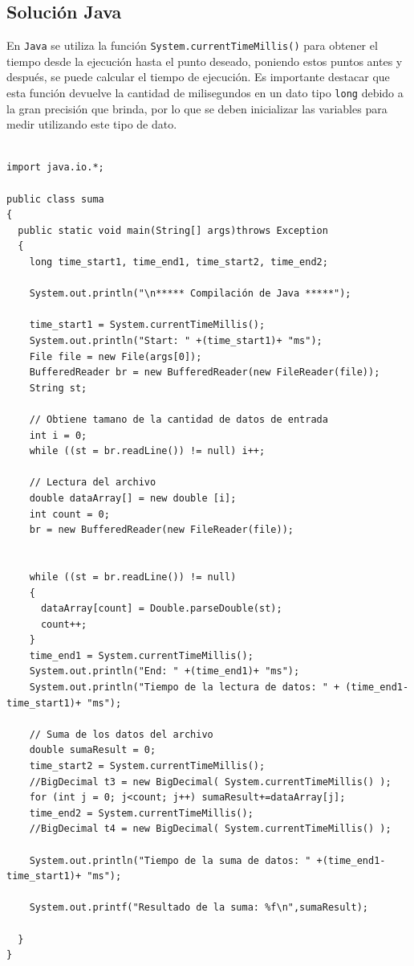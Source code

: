 \subsection{Solución Java}

En \texttt{Java} se utiliza la función \texttt{System.currentTimeMillis()} para obtener el tiempo desde la ejecución hasta el punto deseado, poniendo estos puntos antes y después, se puede calcular el tiempo de ejecución. Es importante destacar que esta función devuelve la cantidad de milisegundos en un dato tipo \texttt{long} debido a la gran precisión que brinda, por lo que se deben inicializar las variables para medir utilizando este tipo de dato.

\begin{verbatim}

import java.io.*;

public class suma
{
  public static void main(String[] args)throws Exception
  {
    long time_start1, time_end1, time_start2, time_end2;

    System.out.println("\n***** Compilación de Java *****");

    time_start1 = System.currentTimeMillis();
    System.out.println("Start: " +(time_start1)+ "ms");
    File file = new File(args[0]);
    BufferedReader br = new BufferedReader(new FileReader(file));
    String st;

    // Obtiene tamano de la cantidad de datos de entrada
    int i = 0;
    while ((st = br.readLine()) != null) i++;

    // Lectura del archivo
    double dataArray[] = new double [i];
    int count = 0;
    br = new BufferedReader(new FileReader(file));


    while ((st = br.readLine()) != null)
    {
      dataArray[count] = Double.parseDouble(st);
      count++;
    }
    time_end1 = System.currentTimeMillis();
    System.out.println("End: " +(time_end1)+ "ms");
    System.out.println("Tiempo de la lectura de datos: " + (time_end1-time_start1)+ "ms");

    // Suma de los datos del archivo
    double sumaResult = 0;
    time_start2 = System.currentTimeMillis();
    //BigDecimal t3 = new BigDecimal( System.currentTimeMillis() );
    for (int j = 0; j<count; j++) sumaResult+=dataArray[j];
    time_end2 = System.currentTimeMillis();
    //BigDecimal t4 = new BigDecimal( System.currentTimeMillis() );

    System.out.println("Tiempo de la suma de datos: " +(time_end1-time_start1)+ "ms");

    System.out.printf("Resultado de la suma: %f\n",sumaResult);

  }
}


\end{verbatim}

